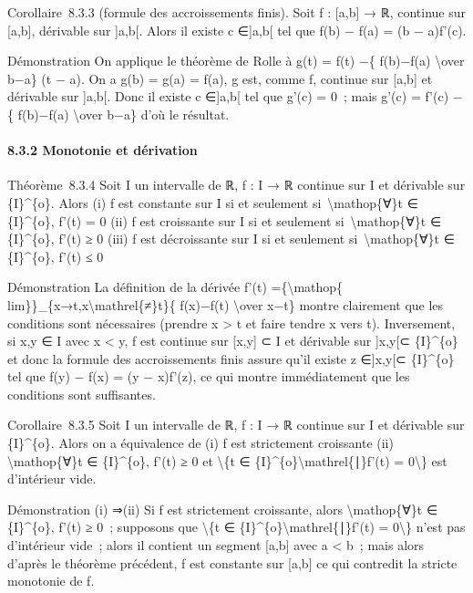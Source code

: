 \documentclass[]{article}
\begin{document}
Corollaire~8.3.3 (formule des accroissements finis). Soit f : {[}a,b{]}
→ ℝ, continue sur {[}a,b{]}, dérivable sur {]}a,b{[}. Alors il existe c
∈{]}a,b{[} tel que f(b) − f(a) = (b − a)f'(c).

Démonstration On applique le théorème de Rolle à g(t) = f(t) −\{
f(b)−f(a) \textbackslash{}over b−a\} (t − a). On a g(b) = g(a) = f(a), g
est, comme f, continue sur {[}a,b{]} et dérivable sur {]}a,b{[}. Donc il
existe c ∈{]}a,b{[} tel que g'(c) = 0~; mais g'(c) = f'(c) −\{ f(b)−f(a)
\textbackslash{}over b−a\} d'où le résultat.

\paragraph{8.3.2 Monotonie et dérivation}

Théorème~8.3.4 Soit I un intervalle de ℝ, f : I → ℝ continue sur I et
dérivable sur \{I\}\^{}\{o\}. Alors (i) f est constante sur I si et
seulement si~\textbackslash{}mathop\{∀\}t ∈ \{I\}\^{}\{o\}, f'(t) = 0
(ii) f est croissante sur I si et seulement
si~\textbackslash{}mathop\{∀\}t ∈ \{I\}\^{}\{o\}, f'(t) ≥ 0 (iii) f est
décroissante sur I si et seulement si~\textbackslash{}mathop\{∀\}t ∈
\{I\}\^{}\{o\}, f'(t) ≤ 0

Démonstration La définition de la dérivée f'(t)
=\{\textbackslash{}mathop\{
lim\}\}\_\{x→t,x\textbackslash{}mathrel\{≠\}t\}\{ f(x)−f(t)
\textbackslash{}over x−t\} montre clairement que les conditions sont
nécessaires (prendre x \textgreater{} t et faire tendre x vers t).
Inversement, si x,y ∈ I avec x \textless{} y, f est continue sur
{[}x,y{]} ⊂ I et dérivable sur {]}x,y{[}⊂ \{I\}\^{}\{o\} et donc la
formule des accroissements finis assure qu'il existe z ∈{]}x,y{[}⊂
\{I\}\^{}\{o\} tel que f(y) − f(x) = (y − x)f'(z), ce qui montre
immédiatement que les conditions sont suffisantes.

Corollaire~8.3.5 Soit I un intervalle de ℝ, f : I → ℝ continue sur I et
dérivable sur \{I\}\^{}\{o\}. Alors on a équivalence de (i) f est
strictement croissante (ii) \textbackslash{}mathop\{∀\}t ∈
\{I\}\^{}\{o\}, f'(t) ≥ 0 et \textbackslash{}\{t ∈
\{I\}\^{}\{o\}\textbackslash{}mathrel\{∣\}f'(t) = 0\textbackslash{}\}
est d'intérieur vide.

Démonstration (i) ⇒(ii) Si f est strictement croissante, alors
\textbackslash{}mathop\{∀\}t ∈ \{I\}\^{}\{o\}, f'(t) ≥ 0~; supposons que
\textbackslash{}\{t ∈ \{I\}\^{}\{o\}\textbackslash{}mathrel\{∣\}f'(t) =
0\textbackslash{}\} n'est pas d'intérieur vide~; alors il contient un
segment {[}a,b{]} avec a \textless{} b~; mais alors d'après le théorème
précédent, f est constante sur {[}a,b{]} ce qui contredit la stricte
monotonie de f.
\end{document}
